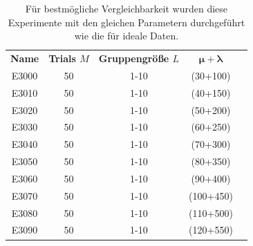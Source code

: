 \begin{table} [H]	
	\label{tab:experiments2}
	\caption[Experimente - Reale Messdaten]{Für bestmögliche Vergleichbarkeit wurden diese Experimente mit den gleichen Parametern durchgeführt wie die für ideale Daten.}
	\begin{center}
		\begin{tabular}{ccccc}
			\textbf{Name} 	& \textbf{Trials $M$} 	& \textbf{Gruppengröße $L$} & \textbf{$\mathbf{\mu}+\mathbf{\lambda}$}\\
			E3000			& 50 				&    1-10		&  (30+100) \\
			E3010			& 50 				&    1-10		&  (40+150) \\
			E3020			& 50 				&    1-10		&  (50+200) \\
			E3030			& 50 				&    1-10		&  (60+250) \\
			E3040			& 50 				&    1-10		&  (70+300) \\			                        
			E3050			& 50 				&    1-10		&  (80+350) \\			                        
			E3060			& 50 				&    1-10		&  (90+400) \\			                        
			E3070			& 50 				&    1-10		&  (100+450) \\			                        
			E3080			& 50 				&    1-10		&  (110+500) \\			                        
			E3090			& 50 				&    1-10		&  (120+550) \\			                        
%			
		\end{tabular}
	\end{center}
\end{table}
%
%
